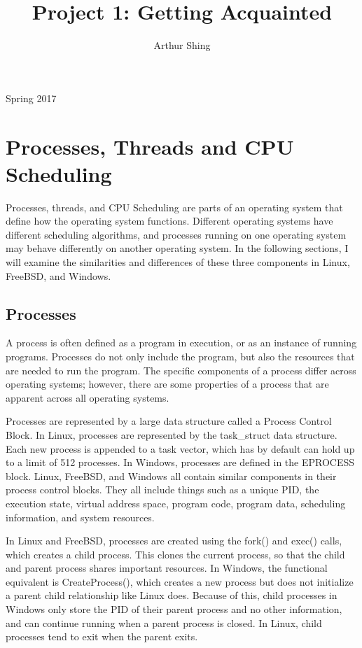 \documentclass[journal, letterpaper, draftclsnofoot, onecolumn, 10pt]{journal}
\begin{document}
\title{Project 1: Getting Acquainted}
\author{Arthur Shing}


\begin{titlepage}
    \centering
    \maketitle
    \large Spring 2017



\end{titlepage}
\tableofcontents
\clearpage


\section{Processes, Threads and CPU Scheduling}

Processes, threads, and CPU Scheduling are parts of an operating system that define how the operating system functions. Different operating systems have different scheduling algorithms, and processes running on one operating system may behave differently on another operating system. In the following sections, I will examine the similarities and differences of these three components in Linux, FreeBSD, and Windows.

\subsection{Processes}

A process is often defined as a program in execution, or as an instance of running programs. Processes do not only include the program, but also the resources that are needed to run the program. The specific components of a process differ across operating systems; however, there are some properties of a process that are apparent across all operating systems.

Processes are represented by a large data structure called a Process Control Block. In Linux, processes are represented by the task\_struct data structure. Each new process is appended to a task vector, which has by default can hold up to a limit of 512 processes. In Windows, processes are defined in the EPROCESS block.  Linux, FreeBSD, and Windows all contain similar components in their process control blocks. They all include things such as a unique PID, the execution state, virtual address space, program code, program data, scheduling information, and system resources.

In Linux and FreeBSD, processes are created using the fork() and exec() calls, which creates a child process. This clones the current process, so that the child and parent process shares important resources. In Windows, the functional equivalent is CreateProcess(), which creates a new process but does not initialize a parent child relationship like Linux does. Because of this, child processes in Windows only store the PID of their parent process and no other information, and can continue running when a parent process is closed. In Linux, child processes tend to exit when the parent exits.
\end{document}
